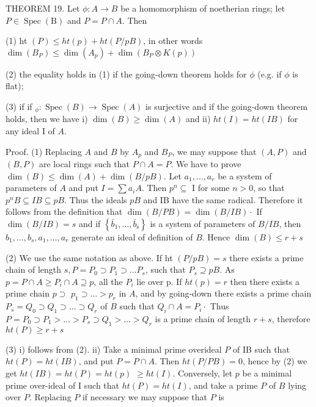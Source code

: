 THEOREM 19. Let $\phi: A \rightarrow B$ be a homomorphism of noetherian rings; let $P \in \operatorname{Spec}(\mathrm{B})$ and $P=P \cap A$. Then

(1) ht $(P) \leqslant h t(p)+h t(P / p B)$, in other words $\operatorname{dim}\left(B_{P}\right) \leqslant \operatorname{dim}\left(A_{p}\right)+\operatorname{dim}\left(B_{P} \otimes K(p)\right)$

(2) the equality holds in (1) if the going-down theorem holds for $\phi$ (e.g. if $\phi$ is flat);

(3) if if $_{\phi}: \operatorname{Spec}(B) \rightarrow \operatorname{Spec}(A)$ is surjective and if the going-down theorem holds, then we have i) $\operatorname{dim}(B) \geqslant \operatorname{dim}(A)$ and ii) $h t(I)=h t(I B)$ for any ideal I of $A$.

Proof. (1) Replacing $A$ and $B$ by $A_{p}$ and $B_{P}$, we may suppose that $(A, P)$ and $(B, P)$ are local rings such that $P \cap A=P$. We have to prove $\operatorname{dim}(B) \leqslant \operatorname{dim}(A)+\operatorname{dim}(B / p B)$. Let $a_{1}, \ldots, a_{r}$ be a system of parameters of $A$ and put $I=\sum a_{i} A$. Then $p^{n} \subseteq$ I for some $n>0$, so that $p^{n} B \subseteq I B \subseteq p B$. Thus the ideals $p B$ and IB have the same radical. Therefore it follows from the definition that $\operatorname{dim}(B / P B)=\operatorname{dim}(B / I B) \cdot$ If $\operatorname{dim}(B / I B)=s$ and if $\left\{\bar{b}_{1}, \ldots, \bar{b}_{\mathrm{s}}\right\}$ is a system of parameters of $B / I B$, then $b_{1}, \ldots, b_{s}, a_{1}, \ldots, a_{r}$ generate an ideal of definition of $B$. Hence $\operatorname{dim}(B) \leqslant r+s$

(2) We use the same notation as above. If ht $(P / p B)=s$ there exists a prime chain of length $s, P=P_{0} \supset P_{1} \supset \ldots P_{s}$, such that $P_{s} \supseteq p B$. As $p=P \cap A \geq P_{i} \cap A \supseteq p$, all the $P_{i}$ lie over p. If $h t(p)=r$ then there exists a prime chain $p \supset$ $p_{1} \supset \ldots>p_{r}$ in $A$, and by going-down there exists a prime chain $P_{s}=Q_{0} \supset Q_{1} \supset \ldots \supset Q_{r}$ of $B$ such that $Q_{i} \cap A=P_{i} \cdot$ Thus $P=P_{0} \supset P_{1}>\ldots>P_{s} \supset Q_{1}>\ldots>Q_{r}$ is a prime chain of length $r+s$, therefore $h t(P) \geqslant r+s$

(3) i) follows from (2). ii) Take a minimal prime overideal $P$ of IB such that $h t(P)=h t(I B)$, and put $P=P \cap A$. Then $h t(P / P B)=0$, hence by (2) we get $h t(I B)=h t(P)=h t(p)$ $\geqslant h t(I)$. Conversely, let $p$ be a minimal prime over-ideal of I such that $h t(P)=h t(I)$, and take a prime $P$ of $B$ lying over $P$. Replacing $P$ if necessary we may suppose that $P$ is

